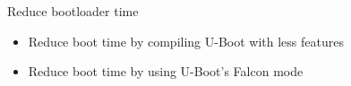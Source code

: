 \setuplabframe
{Reduce bootloader time}
{
\begin{itemize}
\item Reduce boot time by compiling U-Boot with less features
\item Reduce boot time by using U-Boot's Falcon mode
\end{itemize}
}

